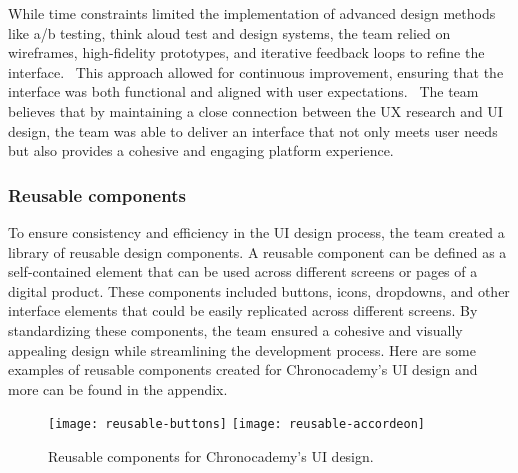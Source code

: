 While time constraints limited the implementation of advanced design methods like a/b testing, think aloud test and design systems, the team relied on wireframes, high-fidelity prototypes, and iterative feedback loops to refine the interface. \ This approach allowed for continuous improvement, ensuring that the interface was both functional and aligned with user expectations. \ The team believes that by maintaining a close connection between the UX research and UI design, the team was able to deliver an interface that not only meets user needs but also provides a cohesive and engaging platform experience.

\subsubsection{Reusable components}\label{subsubsec:rereusable-components}

To ensure consistency and efficiency in the UI design process, the team created a library of reusable design components.
A reusable component can be defined as a self-contained element that can be used across different screens or pages of a digital product.
These components included buttons, icons, dropdowns, and other interface elements that could be easily replicated across different screens.
By standardizing these components, the team ensured a cohesive and visually appealing design while streamlining the development process.
Here are some examples of reusable components created for Chronocademy's UI design and more can be found in the appendix.

\begin{figure}[h]
    \centering
    \texttt{[image: reusable-buttons]}
    \texttt{[image: reusable-accordeon]}
    \caption{Reusable components for Chronocademy's UI design.}
    \label{fig:figure20}
\end{figure}

